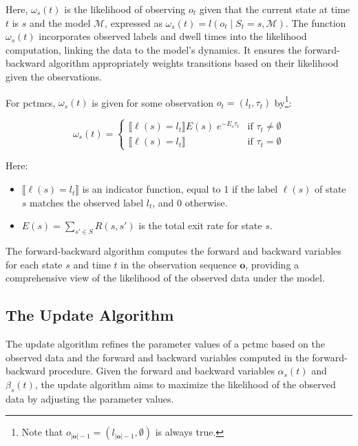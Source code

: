 Here, $\omega_{s}(t)$ is the likelihood of observing $o_t$ given that the current state at time $t$ is $s$ and the model $\mathcal{M}$, expressed as $\omega_s(t) = l(o_t \mid S_t = s, \mathcal{M})$.
The function $\omega_s(t)$ incorporates observed labels and dwell times into the likelihood computation, linking the data to the model's dynamics.
It ensures the forward-backward algorithm appropriately weights transitions based on their likelihood given the observations.

For \glspl{pctmc}, $\omega_{s}(t)$ is given for some observation $o_t = (l_t, \tau_t)$ by\footnote{Note that $o_{|\mathbf{o}|-1} = (l_{|\mathbf{o}|-1}, \emptyset)$ is always true.}:


\begin{equation}
    \omega_s(t) =
    \begin{cases}
        \lBrack \ell(s) = l_t \rBrack E(s) \; e^{-E_s\tau_t} & \text{if } \tau_t \neq \emptyset \\
        \lBrack \ell(s) = l_t \rBrack & \text{if } \tau_t = \emptyset
    \end{cases}
    \label{eq:omega-pctmc}
\end{equation}


Here:


\begin{itemize}
    \item $\lBrack \ell(s) = l_t \rBrack$ is an indicator function, equal to 1 if the label $\ell(s)$ of state $s$ matches the observed label $l_t$, and 0 otherwise.
    \item $E(s) = \sum_{s' \in S} R(s, s')$ is the total exit rate for state $s$.
\end{itemize}


The forward-backward algorithm computes the forward and backward variables for each state $s$ and time $t$ in the observation sequence $\mathbf{o}$, providing a comprehensive view of the likelihood of the observed data under the model.

\subsection{The Update Algorithm}\label{subsec:update-algorithm}
The update algorithm refines the parameter values of a \gls{pctmc} based on the observed data and the forward and backward variables computed in the forward-backward procedure.
Given the forward and backward variables $\alpha_s(t)$ and $\beta_s(t)$, the update algorithm aims to maximize the likelihood of the observed data by adjusting the parameter values.

